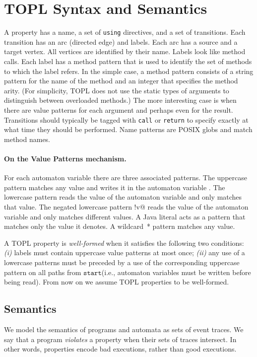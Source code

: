 \documentclass{sigplanconf}[10pt] %
\newcommand{\start}{\ensuremath{\mathtt{start}}\xspace}
\begin{document}
\section{TOPL Syntax and Semantics} %
\label{sec:syntax}
A property has a name, a set of \texttt{using} directives, and a set of transitions.
Each transition has an arc (directed edge) and labels.
Each arc has a source and a target vertex.
All vertices are identified by their name.
Labels look like method calls.
Each label has a method pattern that is used to identify the set of methods to which the label refers.
In the simple case, a method pattern consists of a string pattern for the name of the method and an integer that specifies the method arity.
(For simplicity, TOPL does not use the static types of arguments to distinguish between overloaded methods.)
The more interesting case is when there are value patterns for each argument and perhaps even for the result.
Transitions should typically be tagged with \texttt{call} or \texttt{return} to specify exactly at what time they should be performed.
Name patterns are POSIX globs and match method names.

\paragraph{On the Value Patterns mechanism.}
For each automaton variable \Verb@v@ there are three associated patterns.
The uppercase pattern \Verb@V@ matches any value and writes it in the automaton variable \Verb@v@.
The lowercase pattern \Verb@v@ reads the value of the automaton variable \Verb@v@ and only matches that value.
The negated lowercase pattern \Verb@!v@ reads the value of the automaton variable \Verb@v@ and only matches different values.
A Java literal acts as a pattern that matches only the value it denotes.
A wildcard~* pattern matches any value.

\smallskip
A TOPL property is \emph{well-formed} when it satisfies the following two conditions:
{\em (i)} labels must contain uppercase value patterns at most once; {\em (ii)}
any use of a lowercase patterns must be preceded by a use of the corresponding uppercase pattern on all paths from \start  (i.e., automaton variables must be written before being read).
From now on we assume TOPL properties to be well-formed.

\subsection{Semantics}\label{sec:semantics} %
We model the semantics of programs and automata as sets of event traces.
We say that a program \emph{violates} a property when their sets of traces intersect.
In other words, properties encode bad executions, rather than good executions.
\end{document}
